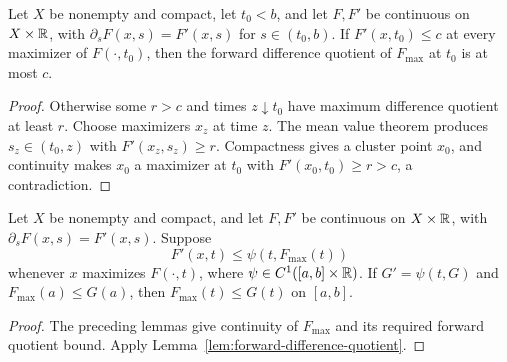 \begin{lemma}
\label{lem:forward-difference-maximum-product}





Let $X$ be nonempty and compact, let $t_0<b$, and let $F,F'$ be
continuous on $X\times\mathbb{R}$, with
$\partial_sF(x,s)=F'(x,s)$ for $s\in(t_0,b)$. If
$F'(x,t_0)\le c$ at every maximizer of $F(\cdot,t_0)$, then the
forward difference quotient of $F_{\max}$ at $t_0$ is at most $c$.
\end{lemma}
\begin{proof}
\sketch

Otherwise some $r>c$ and times $z\downarrow t_0$ have maximum
difference quotient at least $r$. Choose maximizers $x_z$ at time $z$.
The mean value theorem produces $s_z\in(t_0,z)$ with
$F'(x_z,s_z)\ge r$. Compactness gives a cluster point $x_0$, and
continuity makes $x_0$ a maximizer at $t_0$ with
$F'(x_0,t_0)\ge r>c$, a contradiction.
\end{proof}

\begin{corollary}
\label{cor:forward-difference-maximum-product}




Let $X$ be nonempty and compact, and let $F,F'$ be continuous on
$X\times\mathbb{R}$, with $\partial_sF(x,s)=F'(x,s)$. Suppose
$$F'(x,t)\le\psi(t,F_{\max}(t))$$
whenever $x$ maximizes $F(\cdot,t)$, where
$\psi\in C^1([a,b]\times\mathbb{R})$. If $G'=\psi(t,G)$ and
$F_{\max}(a)\le G(a)$, then $F_{\max}(t)\le G(t)$ on $[a,b]$.
\end{corollary}
\begin{proof}
\sketch

The preceding lemmas give continuity of $F_{\max}$ and its required
forward quotient bound. Apply
Lemma~\ref{lem:forward-difference-quotient}.
\end{proof}

